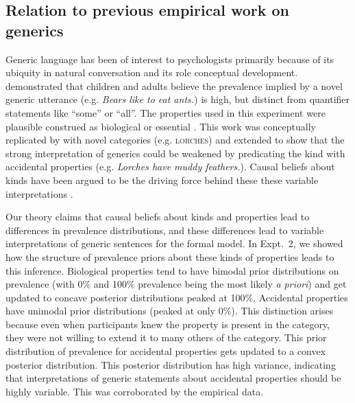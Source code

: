 \documentclass[12pt,letterpaper]{article}
\begin{document}

\subsection*{Relation to previous empirical work on generics}


Generic language has been of interest to psychologists primarily because of its ubiquity in natural conversation and its role conceptual development.
 demonstrated that children and adults believe the prevalence implied by a novel generic utterance (e.g. \emph{Bears like to eat ants.}) is high, but distinct from quantifier statements like ``some'' or ``all''. 
The properties used in this experiment were plausible construed as biological or essential \cite{Gelman2003}.
This work was conceptually replicated by  with novel categories (e.g. \textsc{lorches}) and extended to show that the strong interpretation of generics could be weakened by predicating the kind with accidental properties (e.g. \emph{Lorches have muddy feathers.}).
Causal beliefs about kinds have been argued to be the driving force behind these these variable interpretations \cite{Gelman2007, Cimpian2010c}.

Our theory claims that causal beliefs about kinds and properties lead to differences in prevalence distributions, and these differences lead to variable interpretations of generic sentences for the formal model. 
In Expt.~2, we showed how the structure of prevalence priors about these kinds of properties leads to this inference. 
Biological properties tend to have bimodal prior distributions on prevalence (with 0\% and 100\% prevalence being the most likely \emph{a priori}) and get updated to concave posterior distributions peaked at 100\%.
Accidental properties have unimodal prior distributions (peaked at only 0\%). This distinction arises because even when participants knew the property is present in the category, they were not willing to extend it to many others of the category. This prior distribution of prevalence for accidental properties gets updated to a convex posterior distribution. This posterior distribution has high variance, indicating that interpretations of generic statements about accidental properties should be highly variable. This was corroborated by the empirical data. 
\end{document}
